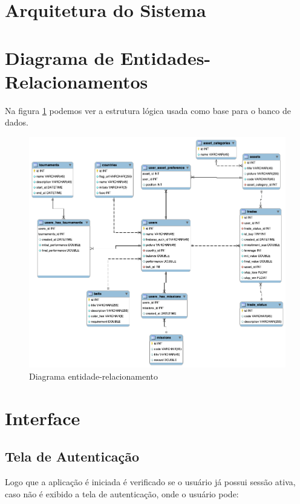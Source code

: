 \section{Arquitetura do Sistema} \label{sec:modelagem:arquitetura}
\section{Diagrama de Entidades-Relacionamentos} \label{sec:modelagem:der}

Na figura \ref{fig:uml_der} podemos ver a estrutura lógica usada como base para o banco de dados.

\begin{figure}[H]
  \caption{\label{fig:uml_der}Diagrama entidade-relacionamento}
  \centering
  \includegraphics[scale=0.5]{imagens/tfc_der.png}
\end{figure}

\section{Interface} \label{sec:modelagem:interface}

\subsection{Tela de Autenticação}
Logo que a aplicação é iniciada é verificado se o usuário já possui sessão ativa, caso não é exibido a tela de autenticação, onde o usuário pode:

